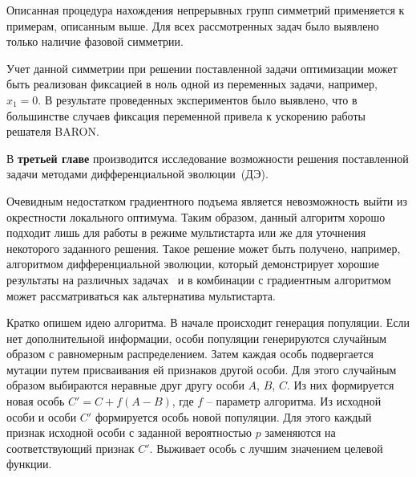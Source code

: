 
Описанная процедура нахождения непрерывных групп симметрий применяется к примерам, описанным выше. Для всех рассмотренных задач было выявлено только наличие фазовой симметрии.

Учет данной симметрии при решении поставленной задачи оптимизации может быть реализован фиксацией в ноль одной из переменных задачи, например, $x_1=0$. В результате проведенных экспериментов было выявлено, что в большинстве случаев фиксация переменной привела к ускорению работы решателя BARON.

В {\textbf{третьей главе}} производится исследование возможности решения поставленной задачи методами дифференциальной эволюции~(ДЭ).

Очевидным недостатком градиентного подъема является невозможность выйти из окрестности локального оптимума. Таким образом, данный алгоритм хорошо подходит лишь для работы в режиме мультистарта или же для уточнения некоторого заданного решения. Такое решение может быть получено, например, алгоритмом дифференциальной эволюции, который  демонстрирует хорошие результаты на различных задачах~ и в комбинации с градиентным алгоритмом может рассматриваться как альтернатива мультистарта.

Кратко опишем идею алгоритма. В начале происходит генерация популяции. Если нет дополнительной информации, особи популяции генерируются случайным образом с равномерным распределением. Затем каждая особь подвергается мутации путем присваивания ей признаков другой особи.
Для этого случайным образом выбираются неравные друг другу особи $A$, $B$, $C$. Из них формируется новая особь $C' = C + f(A - B)$, где $f$ -- параметр алгоритма. Из исходной особи и особи $C'$ формируется особь новой популяции. Для этого каждый признак исходной особи с заданной вероятностью $p$ заменяются на соответствующий признак $C'$. Выживает особь с лучшим значением целевой функции.

